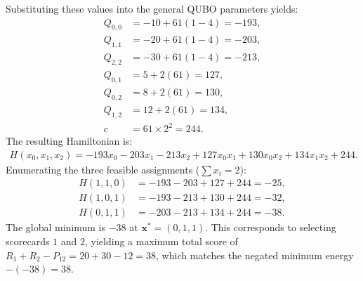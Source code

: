 \documentclass[12pt]{article}
\begin{document}
Substituting these values into the general QUBO parameters yields:
\begin{align}
    Q_{0,0} &= -10 + 61(1 - 4) = -193, \\
    Q_{1,1} &= -20 + 61(1 - 4) = -203, \\
    Q_{2,2} &= -30 + 61(1 - 4) = -213, \\
    Q_{0,1} &= 5 + 2(61) = 127, \\
    Q_{0,2} &= 8 + 2(61) = 130, \\
    Q_{1,2} &= 12 + 2(61) = 134, \\
    c &= 61 \times 2^2 = 244.
\end{align}
The resulting Hamiltonian is:
\begin{align}
    H(x_0, x_1, x_2) = -193x_0 - 203x_1 - 213x_2 + 127x_0x_1 + 130x_0x_2 + 134x_1x_2 + 244.
\end{align}
Enumerating the three feasible assignments ($\sum x_i = 2$):
\begin{align}
    H(1, 1, 0) &= -193 - 203 + 127 + 244 = -25, \\
    H(1, 0, 1) &= -193 - 213 + 130 + 244 = -32, \\
    H(0, 1, 1) &= -203 - 213 + 134 + 244 = -38.
\end{align}
The global minimum is $-38$ at $\mathbf{x}^* = (0, 1, 1)$. This corresponds to selecting scorecards $1$ and $2$, yielding a maximum total score of $R_1 + R_2 - P_{12} = 20 + 30 - 12 = 38$, which matches the negated minimum energy $-(-38) = 38$.
\end{document}
